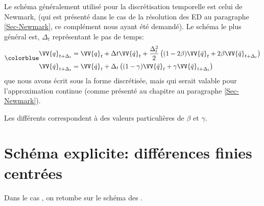 \medskip
Le schéma généralement utilisé pour la discrétisation temporelle est celui de Newmark,
(qui est présenté dans le cas de la résolution des ED au paragraphe \ref{Sec-Newmark},
ce complément nous ayant été demandé).
Le schéma le plus général est, $\Delta_t$ représentant le pas de temps:
\begin{equation}\colorblue
\begin{aligned}
&\VV{q}_{t+\Delta_t} = \VV{q}_t + \Delta t \VV{\dot q}_t + \frac{\Delta_t^2}2\left((1-2\beta)\VV{\ddot q}_t
+2\beta\VV{\ddot q}_{t+\Delta_t}\right) \\
&\VV{\dot q}_{t+\Delta_t} = \VV{\dot q}_t+\Delta_t\left((1-\gamma)\VV{\ddot q}_t+\gamma\VV{\ddot q}_{t+\Delta_t}
\right)
\end{aligned}
\end{equation}
que nous avons écrit sous la forme discrétisée, mais qui serait valable pour l'approximation
continue (comme présenté au chapitre au paragraphe \ref{Sec-Newmark}).

Les différents 
correspondent à des valeurs particulières de $\beta$ et $\gamma$.



\bigskip
\section{Schéma explicite: différences finies centrées}

Dans le cas , on retombe sur le schéma des .

